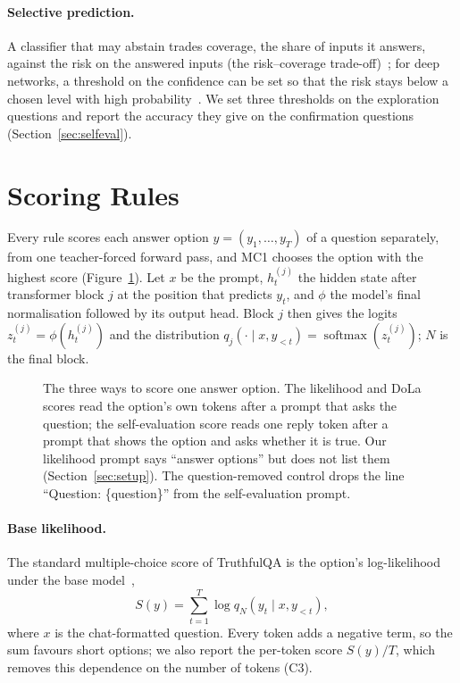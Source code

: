 \documentclass[11pt]{article}
\newcommand{\cha}[1]{\textsf{C#1}}
\begin{document}
\paragraph{Selective prediction.}
A classifier that may abstain trades coverage, the share of inputs it answers, against the risk on the answered
inputs (the risk--coverage trade-off)~\citep{elyaniv2010foundations}; for deep networks, a threshold on the
confidence can be set so that the risk stays below a chosen level with high probability~\citep{geifman2017selective}. We set three thresholds
on the exploration questions and report the accuracy they give on the confirmation questions
(Section~\ref{sec:selfeval}).

\section{Scoring Rules}
\label{sec:rules}

Every rule scores each answer option $y = (y_1, \dots, y_T)$ of a question separately, from one teacher-forced
forward pass, and MC1 chooses the option with the highest score (Figure~\ref{fig:rules}). Let $x$ be the prompt,
$h^{(j)}_t$ the hidden state after transformer block $j$ at the position that predicts $y_t$, and $\phi$ the model's
final normalisation followed by its output head. Block $j$ then gives the logits $z^{(j)}_t = \phi(h^{(j)}_t)$ and
the distribution $q_j(\cdot \mid x, y_{<t}) = \operatorname{softmax}(z^{(j)}_t)$; $N$ is the final block.

\begin{figure}[t]
\centering

\caption{The three ways to score one answer option. The likelihood and DoLa scores read the option's own tokens
after a prompt that asks the question; the self-evaluation score reads one reply token after a prompt that shows
the option and asks whether it is true. Our likelihood prompt says ``answer options'' but does not list them
(Section~\ref{sec:setup}). The question-removed control drops the line ``Question: \{question\}'' from the
self-evaluation prompt.}
\label{fig:rules}
\end{figure}

\paragraph{Base likelihood.}
The standard multiple-choice score of TruthfulQA is the option's log-likelihood under the base
model~\citep{lin2022truthfulqa},
\begin{equation}
  S(y) = \sum_{t=1}^{T} \log q_N(y_t \mid x, y_{<t}),
  \label{eq:likelihood}
\end{equation}
where $x$ is the chat-formatted question. Every token adds a negative term, so the sum favours short options; we
also report the per-token score $S(y)/T$, which removes this dependence on the number of tokens (\cha3).
\end{document}
